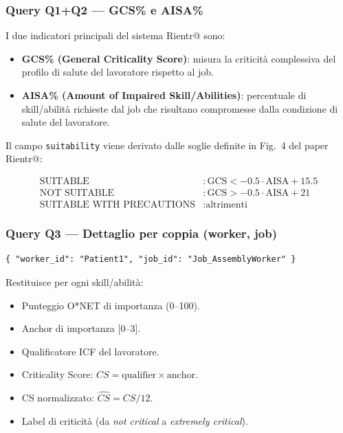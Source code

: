 \documentclass[a4paper,12pt]{article}
\begin{document}
\subsubsection{Query Q1+Q2 --- GCS\% e AISA\%}

I due indicatori principali del sistema Rientr@ sono:

\begin{itemize}
  \item \textbf{GCS\% (General Criticality Score)}: misura la criticit\`{a}
        complessiva del profilo di salute del lavoratore rispetto al job.
  \item \textbf{AISA\% (Amount of Impaired Skill/Abilities)}: percentuale
        di skill/abilit\`{a} richieste dal job che risultano compromesse dalla
        condizione di salute del lavoratore.
\end{itemize}

Il campo \texttt{suitability} viene derivato dalle soglie definite in
Fig.~4 del paper Rientr@:

\begin{align}
  \text{SUITABLE} &: \text{GCS} < -0.5 \cdot \text{AISA} + 15.5 \\
  \text{NOT SUITABLE} &: \text{GCS} > -0.5 \cdot \text{AISA} + 21 \\
  \text{SUITABLE WITH PRECAUTIONS} &: \text{altrimenti}
\end{align}

\subsubsection{Query Q3 --- Dettaglio per coppia (worker, job)}
\vspace{2pt}
\begin{lstlisting}[caption={Request body per \texttt{POST /match/detail}.}]
{ "worker_id": "Patient1", "job_id": "Job_AssemblyWorker" }
\end{lstlisting}

\noindent Restituisce per ogni skill/abilit\`{a}:
\begin{itemize}[noitemsep]
  \item Punteggio O*NET di importanza (0--100).
  \item Anchor di importanza [0--3].
  \item Qualificatore ICF del lavoratore.
  \item Criticality Score: $CS = \text{qualifier} \times \text{anchor}$.
  \item CS normalizzato: $\widehat{CS} = CS / 12$.
  \item Label di criticit\`{a} (da \textit{not critical} a
        \textit{extremely critical}).
\end{itemize}
\end{document}
